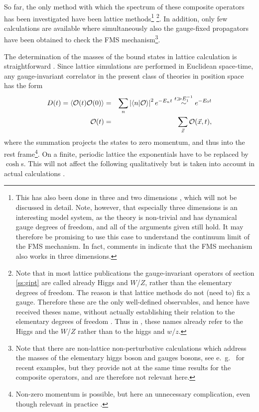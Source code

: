 \documentclass[final,twoside,12pt]{article}
\newcommand*{\no}{\noindent}
\newcommand*{\bea}{\begin{eqnarray}}
\newcommand*{\eea}{\end{eqnarray}}
\newcommand*{\nn}{\nonumber}
\newcommand*{\1}{1\!\!\!\bot}
\newcommand*{\la}{\left\langle}
\newcommand*{\ra}{\right\rangle}
\newcommand*{\op}{{\cal O}}
\begin{document}
So far, the only method with which the spectrum of these composite operators has been investigated have been lattice methods\footnote{This has also been done in three \cite{Karsch:1996aw,Philipsen:1996af,Philipsen:1997rq,Laine:1997nq,Capri:2012cr} and two dimensions \cite{Gongyo:2014jfa}, which will not be discussed in detail. Note, however, that especially three dimensions is an interesting model system, as the theory is non-trivial and has dynamical gauge degrees of freedom, and all of the arguments given still hold. It may therefore be promising to use this case to understand the continuum limit of the FMS mechanism. In fact, comments in \cite{Karsch:1996aw} indicate that the FMS mechanism also works in three dimensions.} \cite{Wurtz:2013ova,Maas:2013aia,Maas:2014pba,Maas:2012tj,Evertz:1986vp,Evertz:1985fc,Langguth:1985eu,Langguth:1985dr,Kuti:1987nr}\footnote{Note that in most lattice publications the gauge-invariant operators of section \ref{ss:gipt} are called already Higgs and $W$/$Z$, rather than the elementary degrees of freedom. The reason is that lattice methods do not (need to) fix a gauge. Therefore these are the only well-defined observables, and  hence have received theses name, without actually establishing their relation to the elementary degrees of freedom \cite{Lang:pc,Wittig:pc}. Thus in \cite{Wurtz:2013ova,Evertz:1986vp,Evertz:1985fc,Langguth:1985eu,Langguth:1985dr,Kuti:1987nr,Philipsen:1996af}, these names already refer to the Higgs and the $W$/$Z$ rather than to the higgs and $w$/$z$.}. In addition, only few calculations are available where simultaneously also the gauge-fixed propagators have been obtained \cite{Maas:2013aia,Maas:2012tj,Maas:2010nc} to check the FMS mechanism\footnote{Note that there are non-lattice non-perturbative calculations which address the masses of the elementary higgs boson and gauges bosons, see e.\ g.\ \cite{Benes:2008ir,Fister:2010yw,Capri:2013oja,Gies:2015lia} for recent examples, but they provide not at the same time results for the composite operators, and are therefore not relevant here.}.

The determination of the masses of the bound states in lattice calculation is straightforward \cite{Montvay:1994cy,Gattringer:2010zz}. Since lattice simulations are performed in Euclidean space-time, any gauge-invariant correlator in the present class of theories in position space has the form \cite{Seiler:1982pw,Frohlich:1981yi}
\bea
D(t)=\la\op(t)\op(0)\ra&=&\sum_n\left|\la n|\op\ra\right|^2e^{-E_n t}\stackrel{t\gg E_1^{-1}}{\sim}e^{-E_0 t}\label{lelevels}\\
\op(t)&=&\sum_{\vec x}\op(\vec x,t)\nn,
\eea
\no where the summation projects the states to zero momentum, and thus into the rest frame\footnote{Non-zero momentum is possible, but here an unnecessary complication, even though relevant in practice \cite{Gattringer:2010zz,Wurtz:2013ova}.}. On a finite, periodic lattice the exponentials have to be replaced by $\cosh$s. This will not affect the following qualitatively but is taken into account in actual calculations \cite{Montvay:1994cy,Gattringer:2010zz}.
\end{document}

